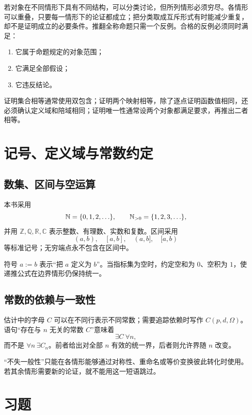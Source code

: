 若对象在不同情形下具有不同结构，可以分类讨论，但所列情形必须穷尽。各情形可以重叠，只要每一情形下的论证都成立；把分类取成互斥形式有时能减少重复，却不是证明成立的必要条件。推翻全称命题只需一个反例。合格的反例必须同时满足：
\begin{enumerate}
  \item 它属于命题规定的对象范围；
  \item 它满足全部假设；
  \item 它违反结论。
\end{enumerate}

证明集合相等通常使用双包含；证明两个映射相等，除了逐点证明函数值相同，还必须确认定义域和陪域相同；证明唯一性通常设两个对象都满足要求，再推出二者相等。

\section{记号、定义域与常数约定}


\subsection{数集、区间与空运算}

本书采用
\[
  \mathbb N=\{0,1,2,\ldots\},\qquad
  \mathbb{N}_{>0}=\{1,2,3,\ldots\},
\]
并用 \(\mathbb Z,\mathbb Q,\mathbb R,\mathbb C\) 表示整数、有理数、实数和复数。区间采用
\[
  (a,b),\quad [a,b],\quad (a,b],\quad [a,b)
\]
等标准记号；无穷端点永不包含在区间中。

符号 \(a:=b\) 表示“把 \(a\) 定义为 \(b\)”。当指标集为空时，约定空和为 \(0\)、空积为 \(1\)，使递推公式在边界情形仍保持统一。

\subsection{常数的依赖与一致性}

估计中的字母 \(C\) 可以在不同行表示不同常数；需要追踪依赖时写作 \(C(p,d,\Omega)\)。语句“存在与 \(n\) 无关的常数 \(C\)”意味着
\[
  \exists C\ \forall n,
\]
而不是 \(\forall n\ \exists C_n\)。前者给出对全部 \(n\) 有效的统一界，后者则允许界随 \(n\) 改变。

“不失一般性”只能在各情形能够通过对称性、重命名或等价变换彼此转化时使用。若其余情形需要新的论证，就不能用这一短语跳过。

\section*{习题}

